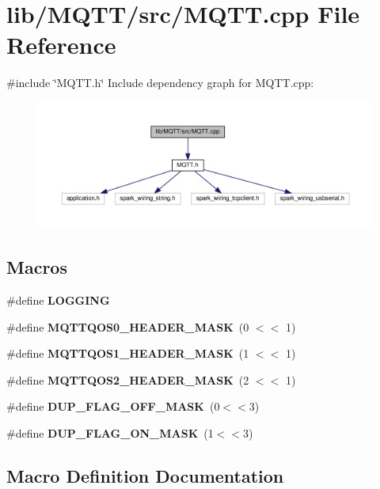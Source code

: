 \section{lib/\+M\+Q\+T\+T/src/\+M\+Q\+TT.cpp File Reference}
\label{_m_q_t_t_8cpp}
{\ttfamily \#include \char`\"{}M\+Q\+T\+T.\+h\char`\"{}}\newline
Include dependency graph for M\+Q\+T\+T.\+cpp\+:\nopagebreak
\begin{figure}[H]
\begin{center}
\leavevmode
\includegraphics[width=350pt]{_m_q_t_t_8cpp__incl}
\end{center}
\end{figure}
\subsection*{Macros}
\begin{DoxyCompactItemize}
\item 
\#define \textbf{ L\+O\+G\+G\+I\+NG}
\item 
\#define \textbf{ M\+Q\+T\+T\+Q\+O\+S0\+\_\+\+H\+E\+A\+D\+E\+R\+\_\+\+M\+A\+SK}~(0 $<$$<$ 1)
\item 
\#define \textbf{ M\+Q\+T\+T\+Q\+O\+S1\+\_\+\+H\+E\+A\+D\+E\+R\+\_\+\+M\+A\+SK}~(1 $<$$<$ 1)
\item 
\#define \textbf{ M\+Q\+T\+T\+Q\+O\+S2\+\_\+\+H\+E\+A\+D\+E\+R\+\_\+\+M\+A\+SK}~(2 $<$$<$ 1)
\item 
\#define \textbf{ D\+U\+P\+\_\+\+F\+L\+A\+G\+\_\+\+O\+F\+F\+\_\+\+M\+A\+SK}~(0$<$$<$3)
\item 
\#define \textbf{ D\+U\+P\+\_\+\+F\+L\+A\+G\+\_\+\+O\+N\+\_\+\+M\+A\+SK}~(1$<$$<$3)
\end{DoxyCompactItemize}


\subsection{Macro Definition Documentation}
\mbox{\label{_m_q_t_t_8cpp_ae5b07ea33567ab16bb09545eacef7bf9}} 
